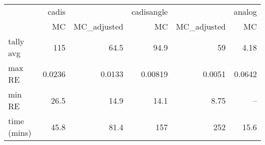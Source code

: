 \begin{tabular}{lrrrrr}
\toprule
{} &  cadis &             & cadisangle &             & analog \\
{} &     MC & MC\_adjusted &         MC & MC\_adjusted &     MC \\
\midrule
tally avg   &    115 &        64.5 &       94.9 &          59 &   4.18 \\
max RE      & 0.0236 &      0.0133 &    0.00819 &      0.0051 & 0.0642 \\
min RE      &   26.5 &        14.9 &       14.1 &        8.75 &    -- \\
time (mins) &   45.8 &        81.4 &        157 &         252 &   15.6 \\
\bottomrule
\end{tabular}
